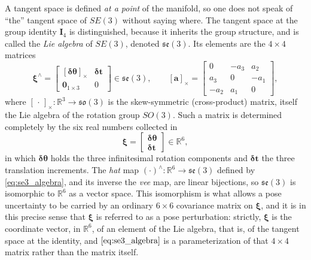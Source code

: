 A tangent space is defined \emph{at a point} of the manifold, so one does not
speak of ``the'' tangent space of $SE(3)$ without saying where. The tangent space
at the group identity $\bm{I}_4$ is distinguished, because it inherits the group
structure, and is called the \emph{Lie algebra} of $SE(3)$, denoted
$\mathfrak{se}(3)$. Its elements are the $4\times4$ matrices
\begin{equation}
  \bm{\xi}^{\wedge} =
  \begin{bmatrix} [\bm{\delta\theta}]_\times & \bm{\delta t} \\[2pt]
                  \bm{0}_{1\times3} & 0 \end{bmatrix} \in \mathfrak{se}(3),
  \qquad
  [\bm{a}]_\times = \begin{bmatrix} 0 & -a_3 & a_2 \\ a_3 & 0 & -a_1 \\ -a_2 & a_1 & 0 \end{bmatrix},
  \label{eq:se3_algebra}
\end{equation}
where $[\,\cdot\,]_\times:\mathbb{R}^3\to\mathfrak{so}(3)$ is the skew-symmetric
(cross-product) matrix, itself the Lie algebra of the rotation group $SO(3)$.
Such a matrix is determined completely by the six real numbers collected in
\begin{equation}
  \bm{\xi} = \begin{bmatrix} \bm{\delta\theta} \\ \bm{\delta t} \end{bmatrix} \in \mathbb{R}^{6},
  \label{eq:se3_coords}
\end{equation}
in which $\bm{\delta\theta}$ holds the three infinitesimal rotation components and
$\bm{\delta t}$ the three translation increments. The \emph{hat} map
$(\cdot)^{\wedge}:\mathbb{R}^{6}\to\mathfrak{se}(3)$ defined by
\eqref{eq:se3_algebra}, and its inverse the \emph{vee} map, are linear bijections,
so $\mathfrak{se}(3)$ is isomorphic to $\mathbb{R}^{6}$ as a vector space. This
isomorphism is what allows a pose uncertainty to be carried by an ordinary
$6\times6$ covariance matrix on $\bm{\xi}$, and it is in this precise sense that
$\bm{\xi}$ is referred to as a pose perturbation: strictly, $\bm{\xi}$ is the
coordinate vector, in $\mathbb{R}^6$, of an element of the Lie algebra, that is,
of the tangent space at the identity, and $\eqref{eq:se3_algebra}$ is a
parameterization of that $4\times4$ matrix rather than the matrix itself.

